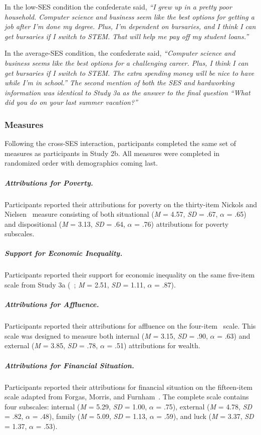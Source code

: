 \documentclass{sfuthesis}
\begin{document}
In the low-SES condition the confederate said, \textit{“I grew up in a pretty poor household. Computer science and business seem like the best options for getting a job after I’m done my degree. Plus, I’m dependent on bursaries, and I think I can get bursaries if I switch to STEM. That will help me pay off my student loans.”}

In the average-SES condition, the confederate said, \textit{“Computer science and business seems like the best options for a challenging career. Plus, I think I can get bursaries if I switch to STEM. The extra spending money will be nice to have while I’m in school.” The second mention of both the SES and hardworking information was identical to Study 3a as the answer to the final question “What did you do on your last summer vacation?”}

\subsubsection{Measures}

Following the cross-SES interaction, participants completed the same set of measures as participants in Study 2b. All measures were completed in randomized order with demographics coming last.

\subparagraph{Attributions for Poverty.} Participants reported their attributions for poverty on the thirty-item Nickols and Nielsen~\cite{nickols11} measure consisting of both situational (\textit{M} = 4.57, \textit{SD} = .67, $\alpha$ = .65) and dispositional (\textit{M} = 3.13, \textit{SD} = .64, $\alpha$ = .76) attributions for poverty subscales.

\subparagraph{Support for Economic Inequality.} Participants reported their support for economic inequality on the same five-item scale from Study 3a (~\cite{wiwadunpub}; \textit{M} = 2.51, \textit{SD} = 1.11, $\alpha$ = .87).

\subparagraph{Attributions for Affluence.} Participants reported their attributions for affluence on the four-item~\cite{furnham83} scale. This scale was designed to measure both internal (\textit{M} = 3.15, \textit{SD} = .90, $\alpha$ = .63) and external (\textit{M} = 3.85, \textit{SD} = .78, $\alpha$ = .51) attributions for wealth.

\subparagraph{Attributions for Financial Situation.} Participants reported their attributions for financial situation on the fifteen-item scale adapted from Forgas, Morris, and Furnham~\cite{forgas82}. The complete scale contains four subscales: internal (\textit{M} = 5.29, \textit{SD} = 1.00, $\alpha$ = .75), external (\textit{M} = 4.78, \textit{SD} = .82, $\alpha$ = .48), family (\textit{M} = 5.09, \textit{SD} = 1.13, $\alpha$ = .59), and luck (\textit{M} = 3.37, \textit{SD} = 1.37, $\alpha$ = .53).
\end{document}
